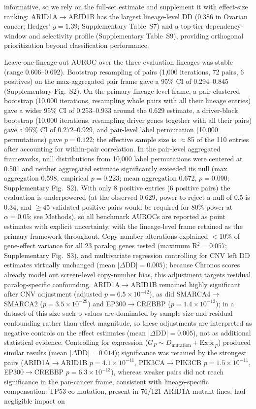 \documentclass[11pt,a4paper]{article}
\begin{document}
informative, so we rely on the full-set estimate and supplement it with effect-size ranking: ARID1A$\rightarrow$ARID1B has the largest lineage-level DD (0.386 in Ovarian cancer; Hedges' $g=1.39$; Supplementary Table~S7) and a top-tier dependency-window and selectivity profile (Supplementary Table~S9), providing orthogonal prioritization beyond classification performance.

Leave-one-lineage-out AUROC over the three evaluation lineages was stable (range 0.606--0.692). Bootstrap resampling of pairs (1,000 iterations, 72 pairs, 6 positives) on the max-aggregated pair frame gave a 95\% CI of 0.294--0.845 (Supplementary Fig.~S2). On the primary lineage-level frame, a pair-clustered bootstrap (10{,}000 iterations, resampling whole pairs with all their lineage entries) gave a wider 95\% CI of 0.253--0.933 around the 0.629 estimate, a driver-block bootstrap (10{,}000 iterations, resampling driver genes together with all their pairs) gave a 95\% CI of 0.272--0.929, and pair-level label permutation (10{,}000 permutations) gave $p=0.122$; the effective sample size is $\approx$85 of the 110 entries after accounting for within-pair correlation. In the pair-level aggregated frameworks, null distributions from 10{,}000 label permutations were centered at 0.501 and neither aggregated estimate significantly exceeded its null (max aggregation 0.598, empirical $p=0.223$; mean aggregation 0.672, $p=0.090$; Supplementary Fig.~S2). With only 8 positive entries (6 positive pairs) the evaluation is underpowered (at the observed 0.629, power to reject a null of 0.5 is 0.34, and $\ge$45 validated positive pairs would be required for 80\% power at $\alpha=0.05$; see Methods), so all benchmark AUROCs are reported as point estimates with explicit uncertainty, with the lineage-level frame retained as the primary framework throughout. Copy number alterations explained $<$10\% of gene-effect variance for all 23 paralog genes tested (maximum R$^2=0.057$; Supplementary Fig.~S3), and multivariate regression controlling for CNV left DD estimates virtually unchanged (mean $|\Delta\text{DD}|=0.005$); because Chronos scores already model out screen-level copy-number bias, this adjustment targets residual paralog-specific confounding. ARID1A$\rightarrow$ARID1B remained highly significant after CNV adjustment (adjusted $p=6.5\times10^{-42}$), as did SMARCA4$\rightarrow$SMARCA2 ($p=3.5\times10^{-29}$) and EP300$\rightarrow$CREBBP ($p=1.4\times10^{-13}$); in a dataset of this size such p-values are dominated by sample size and residual confounding rather than effect magnitude, so these adjustments are interpreted as negative controls on the effect estimates (mean $|\Delta\text{DD}|=0.005$), not as additional statistical evidence. Controlling for expression ($G_P \sim D_{\text{mutation}} + \text{Expr}_P$) produced similar results (mean $|\Delta\text{DD}|=0.014$); significance was retained by the strongest pairs (ARID1A$\rightarrow$ARID1B $p=4.1\times10^{-41}$, PIK3CA$\rightarrow$PIK3CB $p=1.5\times10^{-11}$, EP300$\rightarrow$CREBBP $p=6.3\times10^{-13}$), whereas weaker pairs did not reach significance in the pan-cancer frame, consistent with lineage-specific compensation. TP53 co-mutation, present in 76/121 ARID1A-mutant lines, had negligible impact on 
\end{document}
